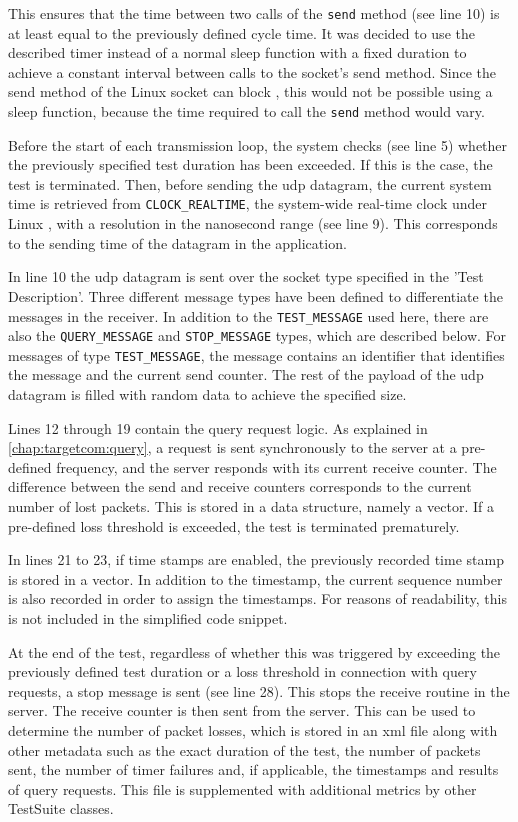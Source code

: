 This ensures that the time between two calls of the \texttt{send} method (see line 10) is at least equal to the previously defined cycle time. It was decided to use the described timer instead of a normal sleep function with a fixed duration to achieve a constant interval between calls to the socket's send method. Since the send method of the Linux socket can block \cite{tsgen01}, this would not be possible using a sleep function, because the time required to call the \texttt{send} method would vary.

Before the start of each transmission loop, the system checks (see line 5) whether the previously specified test duration has been exceeded. If this is the case, the test is terminated. Then, before sending the \ac{udp} datagram, the current system time is retrieved from \texttt{CLOCK\_REALTIME}, the system-wide real-time clock under Linux \cite{tsgen02}, with a resolution in the nanosecond range (see line 9). This corresponds to the sending time of the datagram in the application.

In line 10 the \ac{udp} datagram is sent over the socket type specified in the 'Test Description'. Three different message types have been defined to differentiate the messages in the receiver. In addition to the \texttt{TEST\_MESSAGE} used here, there are also the \texttt{QUERY\_MESSAGE} and \texttt{STOP\_MESSAGE} types, which are described below. For messages of type \texttt{TEST\_MESSAGE}, the message contains an identifier that identifies the message and the current send counter. The rest of the payload of the \ac{udp} datagram is filled with random data to achieve the specified size.

Lines 12 through 19 contain the query request logic. As explained in \ref{chap:targetcom:query}, a request is sent synchronously to the server at a pre-defined frequency, and the server responds with its current receive counter. The difference between the send and receive counters corresponds to the current number of lost packets. This is stored in a data structure, namely a vector. If a pre-defined loss threshold is exceeded, the test is terminated prematurely.

In lines 21 to 23, if time stamps are enabled, the previously recorded time stamp is stored in a vector. In addition to the timestamp, the current sequence number is also recorded in order to assign the timestamps. For reasons of readability, this is not included in the simplified code snippet.

At the end of the test, regardless of whether this was triggered by exceeding the previously defined test duration or a loss threshold in connection with query requests, a stop message is sent (see line 28). This stops the receive routine in the server. The receive counter is then sent from the server. This can be used to determine the number of packet losses, which is stored in an \ac{xml} file along with other metadata such as the exact duration of the test, the number of packets sent, the number of timer failures and, if applicable, the timestamps and results of query requests. This file is supplemented with additional metrics by other TestSuite classes.

